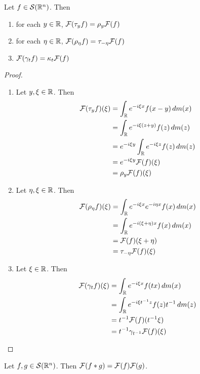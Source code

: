 \documentclass{book}
\begin{document}
	\begin{ex}
		Let $f \in \mathcal{S}(\mathbb{R}^n)$. Then 
		\begin{enumerate}
			\item for each $y \in \mathbb{R}$, $\mathcal{F}(\tau_yf) = \rho_{y} \mathcal{F}(f)$ 
			\item for each $\eta \in \mathbb{R}$, $\mathcal{F}(\rho_{\eta} f) = \tau_{-\eta} \mathcal{F}(f)$
			\item $\mathcal{F}(\gamma_t f) = \kappa_{t} \mathcal{F}(f)$
		\end{enumerate}
	\end{ex}

	\begin{proof}\
		\begin{enumerate}
			\item Let $y, \xi \in \mathbb{R}$. Then 
			\begin{align*}
				\mathcal{F}(\tau_yf)(\xi) 
				& = \int_{\mathbb{R}} e^{-i\xi x} f(x-y) \, d m(x) \\
				& = \int_{\mathbb{R}} e^{-i\xi (z+y)} f(z) \, d m(z) \\
				& = e^{-i\xi y} \int_{\mathbb{R}} e^{-i\xi z} f(z) \, d m(z) \\
				& = e^{-i\xi y} \mathcal{F}(f)(\xi) \\
				& = \rho_{y} \mathcal{F}(f)(\xi)
			\end{align*}
			\item Let $\eta, \xi \in \mathbb{R}$. Then 
			\begin{align*}
				\mathcal{F}(\rho_{\eta}f)(\xi) 
				& = \int_{\mathbb{R}} e^{-i\xi x} e^{-i\eta x}f(x) \, d m(x) \\
				& = \int_{\mathbb{R}} e^{-i(\xi + \eta)x} f(x) \, d m(x) \\
				& = \mathcal{F}(f)(\xi + \eta) \\
				&= \tau_{-\eta}\mathcal{F}(f)(\xi)
			\end{align*}
			\item Let $\xi \in \mathbb{R}$. Then 
			\begin{align*}
				\mathcal{F}(\gamma_t f)(\xi) 
				& = \int_{\mathbb{R}} e^{-i\xi x} f(tx) \, d m(x) \\
				& = \int_{\mathbb{R}} e^{-i\xi t^{-1} z} f(z) t^{-1}\, d m(z) \\
				& = t^{-1}\mathcal{F}(f)(t^{-1} \xi) \\
				& = t^{-1} \gamma_{t^{-1}} \mathcal{F}(f)(\xi)
			\end{align*}
		\end{enumerate}
	\end{proof}

	\begin{ex}
		Let $f,g \in \mathcal{S}(\mathbb{R}^n)$. Then $\mathcal{F}(f*g) = \mathcal{F}(f)\mathcal{F}(g)$.
	\end{ex}
\end{document}
